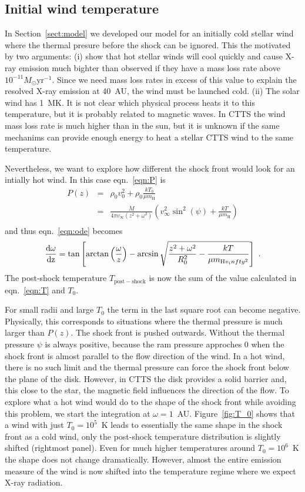 \subsection{Initial wind temperature}
\label{sect:T_0}
In Section~\ref{sect:model} we developed our model for an initially cold stellar wind where the thermal presure before the shock can be ignored. This the motivated by two arguments: (i) \citet{2007IAUS..243..299M} show that hot stellar winds will cool quickly and cause X-ray emission much bighter than observed if they have a mass loss rate above $10^{-11}M_\odot\mathrm{ yr}^{-1}$. Since we need mass loss rates in excess of this value to explain the resolved X-ray emission at 40~AU, the wind must be launched cold. (ii) The solar wind has 1~MK. It is not clear which physical process heats it to this temperature, but it is probably related to magnetic waves. In CTTS the wind mass loss rate is much higher than in the sun, but it is unknown if the same mechanims can provide enough energy to heat a stellar CTTS wind to the same temperature.

Nevertheless, we want to explore how different the shock front would look for an intially hot wind.
In this case eqn.~\ref{eqn:P} is
\begin{eqnarray}
P(z) & = & \rho_0 v_0^2 + \rho_0 \frac{k T_0}{\mu m_{\textrm{H}}} \nonumber\\ 
     & = & \frac{\dot{M}}{4\pi v_{\infty}(z^2+\omega^2)} \left( v_{\infty}^2 \sin^2(\psi) + \frac{kT}{\mu m_{\textrm{H}}}\right)\\
\end{eqnarray}
and thus eqn.~\ref{eqn:ode} becomes
\begin{equation}
\frac{\rm{d}\omega}{\rm{d}z} = \tan\left[\arctan\left(\frac{\omega}{z}\right)-\arcsin\sqrt{\frac{z^2+\omega^2}{R_0^2}-\frac{kT}{\mu m_{\textrm{H} v_infty^2}}}\right]\ .
\end{equation}
The post-shock temperature $T_{\mathrm{post-shock}}$ is now the sum of the value calculated in eqn.~\ref{eqn:T} and $T_0$.

For small radii and large $T_0$ the term in the last square root can become negative. Physically, this corresponds to situations where the thermal pressure is much larger than $P(z)$. The shock front is pushed outwards. Without the thermal pressure $\psi$ is always positive, because the ram pressure approches 0 when the shock front is almost parallel to the flow direction of the wind. In a hot wind, there is no such limit and the thermal pressure can force the shock front below the plane of the disk. However, in CTTS the disk provides a solid barrier and, this close to the star, the magnetic field influences the direction of the flow. To explore what a hot wind would do to the shape of the shock front while avoiding this problem, we start the integration at $\omega=1$~AU. Figure~\ref{fig:T_0} shows that a wind with just $T_0=10^5$~K leads to essentially the same shape in the shock front as a cold wind, only the post-shock temperature distribution is slightly shifted (rightmost panel). Even for much higher temperatures around $T_0=10^6$~K the shape does not change dramatically. However, almost the entire emission measure of the wind is now shifted into the temperature regime where we expect X-ray radiation.

